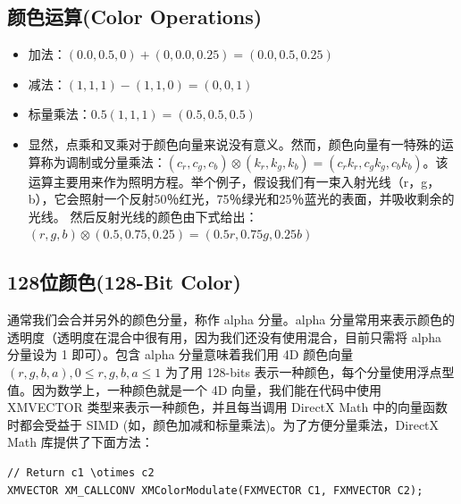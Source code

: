 \documentclass[11pt,a4paper,oldfontcommands]{memoir}
\begin{document}
{\subsection{颜色运算(Color Operations)}
\begin{itemize}
    \item 加法：$(0.0, 0.5, 0) + (0, 0.0, 0.25) = (0.0, 0.5, 0.25)$
    \item 减法：$(1, 1, 1) - (1, 1, 0) = (0, 0, 1)$
    \item 标量乘法：$0.5(1, 1, 1) = (0.5, 0.5, 0.5)$
    \item 显然，点乘和叉乘对于颜色向量来说没有意义。然而，颜色向量有一特殊的运算称为调制或分量乘法：$(c_{r},c_{g},c_{b}) \otimes (k_{r},k_{g},k_{b}) = (c_{r}k_{r},c_{g}k_{g},c_{b}k_{b})$。该运算主要用来作为照明方程。举个例子，假设我们有一束入射光线（r，g，b），它会照射一个反射50％红光，75％绿光和25％蓝光的表面，并吸收剩余的光线。 然后反射光线的颜色由下式给出：$(r,g,b) \otimes (0.5,0.75,0.25) = (0.5r,0.75g,0.25b)$
\end{itemize}

\subsection{128位颜色(128-Bit Color)}
\begin{flushleft}
通常我们会合并另外的颜色分量，称作 alpha 分量。alpha 分量常用来表示颜色的透明度（透明度在混合中很有用，因为我们还没有使用混合，目前只需将 alpha 分量设为 1 即可）。包含 alpha 分量意味着我们用 4D 颜色向量$(r, g, b, a), 0 \leq r,g,b,a \leq 1$ 为了用 128-bits 表示一种颜色，每个分量使用浮点型值。因为数学上，一种颜色就是一个 4D 向量，我们能在代码中使用 XMVECTOR 类型来表示一种颜色，并且每当调用 DirectX Math 中的向量函数时都会受益于 SIMD (如，颜色加减和标量乘法)。为了方便分量乘法，DirectX Math 库提供了下面方法：
\begin{lstlisting}
// Return c1 \otimes c2
XMVECTOR XM_CALLCONV XMColorModulate(FXMVECTOR C1, FXMVECTOR C2);
\end{lstlisting}
\end{flushleft}

}
\end{document}
